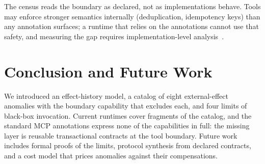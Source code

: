 \documentclass{article}
\begin{document}
\medskip

\noindent
The census reads
the boundary as declared, not as implementations behave. Tools may enforce
stronger semantics internally (deduplication, idempotency keys) than any
annotation surfaces; a runtime that relies on the annotations cannot use that
safety, and measuring the gap requires implementation-level
analysis~\cite{toeppe2026mcpdataset}.

\section{Conclusion and Future Work}

We introduced an effect-history model, a catalog of eight external-effect
anomalies with the boundary capability that excludes each, and four limits
of black-box invocation. Current runtimes cover fragments of the catalog,
and the standard MCP annotations express none of the capabilities in full:
the missing layer is reusable transactional contracts at the tool boundary.
Future work includes formal proofs of the limits, protocol synthesis from
declared contracts, and a cost model that prices anomalies against their
compensations.

\setlength{\bibsep}{0pt plus 0.5pt}


\end{document}
